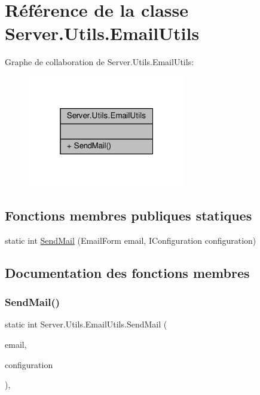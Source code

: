 \hypertarget{class_server_1_1_utils_1_1_email_utils}{}\section{Référence de la classe Server.\+Utils.\+Email\+Utils}
\label{class_server_1_1_utils_1_1_email_utils}


Graphe de collaboration de Server.\+Utils.\+Email\+Utils\+:\nopagebreak
\begin{figure}[H]
\begin{center}
\leavevmode
\includegraphics[width=196pt]{class_server_1_1_utils_1_1_email_utils__coll__graph}
\end{center}
\end{figure}
\subsection*{Fonctions membres publiques statiques}
\begin{DoxyCompactItemize}
\item 
static int \hyperlink{class_server_1_1_utils_1_1_email_utils_a591df5a567a0dd54572bea9f007ab631}{Send\+Mail} (Email\+Form email, I\+Configuration configuration)
\end{DoxyCompactItemize}


\subsection{Documentation des fonctions membres}
\mbox{\label{class_server_1_1_utils_1_1_email_utils_a591df5a567a0dd54572bea9f007ab631}} 
\subsubsection{\texorpdfstring{Send\+Mail()}{SendMail()}}
{\footnotesize\ttfamily static int Server.\+Utils.\+Email\+Utils.\+Send\+Mail (\begin{DoxyParamCaption}\item[{Email\+Form}]{email,  }\item[{I\+Configuration}]{configuration }\end{DoxyParamCaption})\hspace{0.3cm}{\ttfamily [inline]}, {\ttfamily [static]}}






